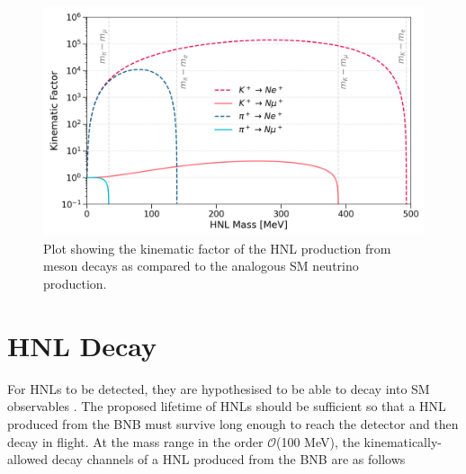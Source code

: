 
\begin{figure}[t] 
\centering    
\includegraphics[width=1.0\textwidth]{kinematics_factor}
\caption[KinematicsFactor]{
Plot showing the kinematic factor of the HNL production from meson decays as compared to the analogous SM neutrino production.
}
\label{fig:KinematicsFactor}
\end{figure}

\section{HNL Decay}
\label{sec2Decay}


For HNLs to be detected, they are hypothesised to be able to decay into SM observables \cite{HNLKelly}.
The proposed lifetime of HNLs should be sufficient so that a HNL produced from the BNB must survive long enough to reach the detector and then decay in flight.
At the mass range in the order $\mathcal{O}$(100 MeV), the kinematically-allowed decay channels of a HNL produced from the BNB are as follows \cite{SBNHNL}


